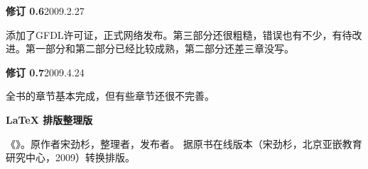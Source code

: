 
\noindent\textbf{修订 0.\BookSplit{}6}\hfill 2009.\BookSplit{}2.\BookSplit{}27\par
添加了GFDL许可证，正式网络发布。第三部分还很粗糙，错误也有不少，有待改进。第一部分和第二部分已经比较成熟，第二部分还差三章没写。

\noindent\textbf{修订 0.\BookSplit{}7}\hfill 2009.\BookSplit{}4.\BookSplit{}24\par
全书的章节基本完成，但有些章节还很不完善。

\medskip\noindent\textbf{LaTeX 排版整理版 \EditionVersion}\hfill \EditionDate\par
《\EditionTitle》。原作者宋劲杉，整理者\EditionEditor，发布者\EditionPublisher。
据原书在线版本（宋劲杉，北京亚嵌教育研究中心，2009）转换排版。

